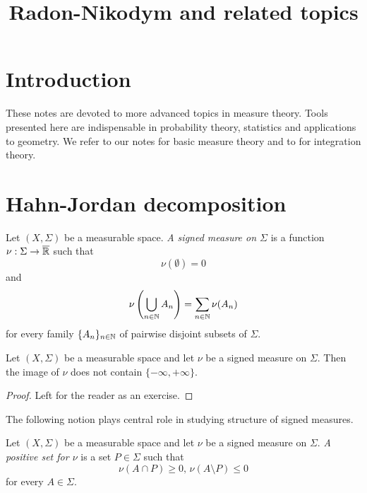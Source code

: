 



\title{Radon-Nikodym and related topics}
\date{}
\maketitle

\section{Introduction}
\noindent
These notes are devoted to more advanced topics in measure theory. Tools presented here are indispensable in probability theory, statistics and applications to geometry. We refer to our notes \cite{Introduction_to_measure_theory} for basic measure theory and to \cite{Integration} for integration theory.

\section{Hahn-Jordan decomposition}

\begin{definition}
    Let $\left(X,\Sigma\right)$ be a measurable space. \textit{A signed measure on $\Sigma$} is a function $\nu:\Sigma\rightarrow \overline{{\mathbb R}}$ such that $$\nu(\emptyset)=0$$
    and
    $$\nu\left(\bigcup_{n\in {\mathbb N}}A_n\right)=\sum_{n\in {\mathbb N}}\nu(A_n)$$
    for every family $\{A_n\}_{n\in {\mathbb N}}$ of pairwise disjoint subsets of $\Sigma$.
\end{definition}

\begin{fact}\label{fact:one_side_infinity_only_for_signed_measure}
    Let $\left(X,\Sigma\right)$ be a measurable space and let $\nu$ be a signed measure on $\Sigma$. Then the image of $\nu$ does not contain $\{-\infty,+\infty\}$.
\end{fact}
\begin{proof}
    Left for the reader as an exercise.
\end{proof}
\noindent
The following notion plays central role in studying structure of signed measures.

\begin{definition}
    Let $\left(X,\Sigma\right)$ be a measurable space and let $\nu$ be a signed measure on $\Sigma$. \textit{A positive set for $\nu$} is a set $P \in \Sigma$ such that
    $$\nu(A\cap P) \geq 0,\,\nu(A\setminus P)\leq 0$$
    for every $A \in \Sigma$.
\end{definition}

